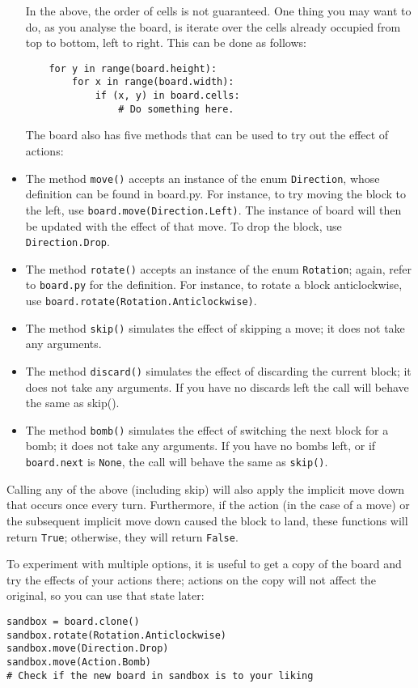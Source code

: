 \documentclass{article}
\begin{document}
\begin{itemize}
In the above, the order of cells is not guaranteed. One thing you may
want to do, as you analyse the board, is iterate over the cells
already occupied from top to bottom, left to right. This can be done
as follows:
\begin{verbatim}  
    for y in range(board.height):
        for x in range(board.width):
            if (x, y) in board.cells:
                # Do something here.
\end{verbatim}
The board also has five methods that can be used to try out the effect of actions:
\item The method \texttt{move()} accepts an instance of the enum
  \texttt{Direction}, whose definition can be found in board.py. For
  instance, to try moving the block to the left, use
  \texttt{board.move(Direction.Left)}. The instance of board will then
  be updated with the effect of that move. To drop the block, use
  \texttt{Direction.Drop}.
\item The method \texttt{rotate()} accepts an instance of the enum
  \texttt{Rotation}; again, refer to \texttt{board.py} for the
  definition. For instance, to rotate a block anticlockwise, use
  \texttt{board.rotate(Rotation.Anticlockwise)}.
\item The method \texttt{skip()} simulates the effect of skipping a
  move; it does not take any arguments.
\item The method \texttt{discard()} simulates the effect of discarding
  the current block; it does not take any arguments.  If you have no
  discards left the call will behave the same as skip().
\item The method \texttt{bomb()} simulates the effect of switching the
  next block for a bomb; it does not take any arguments. If you have
  no bombs left, or if \texttt{board.next} is \texttt{None}, the call
  will behave the same as \texttt{skip()}.
\end{itemize}
Calling any of the above (including skip) will also apply the implicit
move down that occurs once every turn. Furthermore, if the action (in
the case of a move) or the subsequent implicit move down caused the
block to land, these functions will return \texttt{True}; otherwise,
they will return \texttt{False}.

To experiment with multiple options, it is useful to get a copy of the
board and try the effects of your actions there; actions on the copy
will not affect the original, so you can use that state later:
\begin{verbatim}
sandbox = board.clone()
sandbox.rotate(Rotation.Anticlockwise)
sandbox.move(Direction.Drop)
sandbox.move(Action.Bomb)
# Check if the new board in sandbox is to your liking
\end{verbatim}
\end{document}
